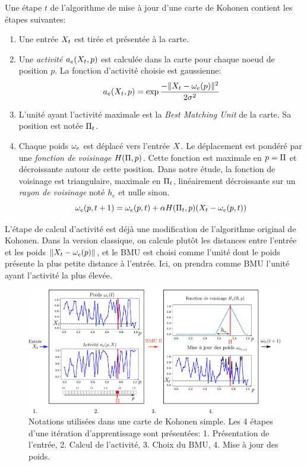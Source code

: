 \documentclass[../main]{subfiles}
\begin{document}
Une étape $t$ de l'algorithme de mise à jour d'une carte de Kohonen contient les étapes suivantes:
\begin{enumerate}
\item\label{enum:inp} Une entrée $X_t$ est tirée et présentée à la carte.
\item\label{enum:act} Une \emph{activité} $a_e(X_t,p)$ est calculée dans la carte pour chaque noeud de position $p$. La fonction d'activité choisie est gaussienne:
\begin{equation}\label{eq:act1som}
a_e(X_t,p) = \exp{\frac{-\lVert X_t-\omega_{e}(p) \rVert ^2}{2\sigma^2}}
\end{equation}
\item\label{enum:bmu} L'unité ayant l'activité maximale est la \emph{Best Matching Unit} de la carte. Sa position est notée $\Pi_t$.
\item Chaque poids $\omega_e$ est déplacé vers l'entrée $X$. Le déplacement est pondéré par une \emph{fonction de voisinage} $H(\Pi,p)$. Cette fonction est maximale en $p = \Pi$ et décroissante autour de cette position. Dans notre étude, la fonction de voisinage est triangulaire,  maximale en $\Pi_t$, linéairement décroissante sur un \emph{rayon de voisinage} noté $h_e$ et nulle sinon.
\begin{equation}
\omega_e(p,t+1) = \omega_e(p,t) + \alpha H(\Pi_t,p)(X_t - \omega_e(p,t))
\label{eq:update}
\end{equation}
\end{enumerate}
L'étape de calcul d'activité est déjà une modification de l'algorithme original de Kohonen.
Dans la version classique, on calcule plutôt les distances entre l'entrée et les poids $\lVert X_t - \omega_e(p) \rVert$, et le BMU est choisi comme l'unité dont le poids présente la plus petite distance à l'entrée. 
Ici, on prendra comme BMU l'unité ayant l'activité la plus élevée.

\begin{figure}
\centering
\includegraphics[width=\textwidth]{one_map_one_layer2.pdf}
\caption{Notations utilisées dans une carte de Kohonen simple. Les 4 étapes d'une itération d'apprentissage sont présentées: 1. Présentation de l'entrée, 2. Calcul de l'activité, 3. Choix du BMU, 4. Mise à jour des poids.}
\label{fig:one_map_not}
\end{figure}
\end{document}
